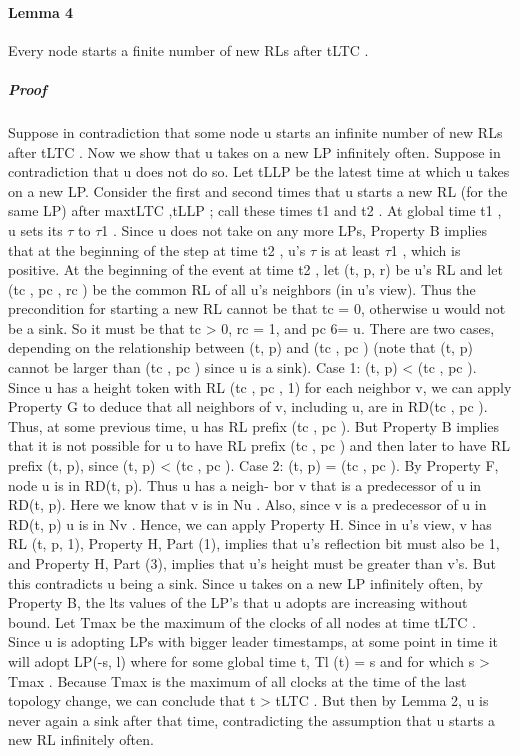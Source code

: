\paragraph{Lemma 4} Every node starts a finite number of new RLs after tLTC .
\subparagraph{Proof} Suppose in contradiction that some node u starts an infinite number of new RLs after tLTC . Now we show that u takes on a new LP infinitely often. Suppose in contradiction that u does not do so. Let tLLP be the latest time at which u takes on a new LP. Consider the first and second times that u starts a new RL (for the same LP) after max{tLTC ,tLLP }; call these times t1 and t2 . At global time t1 , u sets its $\tau$ to $\tau$1 . Since u does not take on any more LPs, Property B implies that at the beginning of the step at time t2 , u’s $\tau$ is at least $\tau$1 , which is positive. At the beginning of the event at time t2 , let (t, p, r) be u’s RL and let (tc , pc , rc ) be the common RL of all u’s neighbors (in u’s view). Thus the precondition for starting a new RL cannot be that tc = 0, otherwise u would not be a sink. So it must be that tc > 0, rc = 1, and pc 6= u. There are two cases, depending on the relationship between (t, p) and (tc , pc ) (note that (t, p) cannot be larger than (tc , pc ) since u is a sink).
Case 1: (t, p) < (tc , pc ). Since u has a height token with RL (tc , pc , 1) for each neighbor v, we can apply Property G to deduce that all neighbors of v, including u, are in RD(tc , pc ). Thus, at some previous time, u has RL prefix (tc , pc ). But Property B implies that it is not possible for u to have RL prefix (tc , pc ) and then later to have RL prefix (t, p), since (t, p) < (tc , pc ). Case 2: (t, p) = (tc , pc ). By Property F, node u is in RD(t, p). Thus u has a neigh- bor v that is a predecessor of u in RD(t, p). Here we know that v is in Nu . Also, since v is a predecessor of u in RD(t, p) u is in Nv . Hence, we can apply Property H. Since in u’s view, v has RL (t, p, 1), Property H, Part (1), implies that u’s reflection bit must also be 1, and Property H, Part (3), implies that u’s height must be greater than v’s. But this contradicts u being a sink. Since u takes on a new LP infinitely often, by Property B, the lts values of the LP’s that u adopts are increasing without bound. Let Tmax be the maximum of the clocks of all nodes at time tLTC . Since u is adopting LPs with bigger leader timestamps, at some point in time it will adopt LP(-s, l) where for some global time t, Tl (t) = s and for which s > Tmax . Because Tmax is the maximum of all clocks at the time of the last topology change, we can conclude that t > tLTC . But then by Lemma 2, u is never again a sink after that time, contradicting the assumption that u starts a new RL infinitely often.
